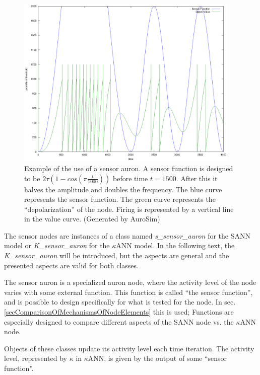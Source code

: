 \begin{figure}[hbt!p]
	\centering
	\includegraphics[width=0.95\textwidth]{sensorAuron.eps}
	\caption{Example of the use of a sensor auron. A sensor function is designed to be \mbox{$2\tau (1-cos(\pi \frac{t}{1000}))$} before time $t=1500$. After this it halves the amplitude and doubles the frequency.
			The blue curve represents the sensor function. The green curve represents the ``depolarization'' of the node. Firing is represented by a vertical line in the value curve.
			(Generated by AuroSim)} 
	\label{figSensorAuronExample}
\end{figure}

	The sensor nodes are instances of a class named \emph{s\_sensor\_auron} for the SANN model or \emph{K\_sensor\_auron} for the $\kappa$ANN model.
	In the following text, the \emph{K\_sensor\_auron} will be introduced, but the aspects are general and the presented aspects are valid for both classes. %

 	The sensor auron is a specialized auron node, where the activity level of the node varies with some external function.
	This function is called ``the sensor function'', and is possible to design specifically for what is tested for the node.
	In sec. \ref{secComparisonOfMechanismsOfNodeElements} this is used;
		Functions are especially designed to compare different aspects of the SANN node vs. the $\kappa$ANN node. %

	Objects of these classes update its activity level each time iteration.
	The activity level, represented by $\kappa$ in $\kappa$ANN, is given by the output of some ``sensor function''.

